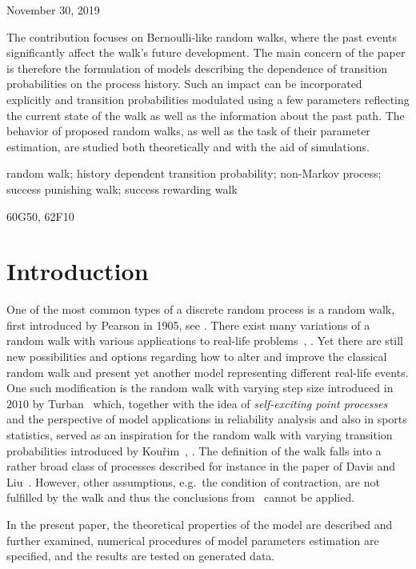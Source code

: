 \rec November 30, 2019

\abstract
The contribution focuses on Bernoulli-like random walks,
 where the past events significantly affect the walk's future
 development.
 The main concern of the paper is therefore the
 formulation of models describing the dependence of transition
 probabilities on the process history.
 Such an impact can be
 incorporated explicitly and transition probabilities modulated
 using a few parameters reflecting the current state of the walk as
 well as the information about the past path.
 The behavior of
 proposed random walks, as well as the task of their parameter
 estimation, are studied both theoretically and with the aid of
 simulations.

\key
random walk; history dependent transition
probability; non-Markov process; success punishing walk; success rewarding walk

\AMS
 60G50, 62F10


\section{Introduction}\label{sec:introduction}

One of the most
common types of a discrete random process is a random walk,
first introduced by Pearson in 1905, see \cite{pearson1905problem}.
There exist many
variations of a random walk with various applications to real-life
problems~\cite{schutz2004elephants}, \cite{turban2010random}.
Yet there are
still new possibilities and options regarding how to alter and improve the classical
random walk and present yet another model representing different
real-life events.
One such modification is the random walk with varying
step size introduced in $2010$ by Turban~\cite{turban2010random}
which, together with the idea of \emph{self-exciting point processes}~\cite{hawkes1971spectra} and the perspective of model applications
in reliability analysis and also in sports statistics, served as an
inspiration for the random walk with varying transition probabilities
introduced by Kou\v{r}im~\cite{ja2017ddny}, \cite{ja2019teze}.
The definition of the walk falls into a rather broad class of processes described for instance in the paper of
Davis and Liu~\cite{davis2012theory}.
However, other assumptions, e.g.~the condition of contraction, are
not fulfilled by the walk and thus the conclusions from~\cite{davis2012theory} cannot be applied.

In the present paper, the theoretical properties of the model are
described and further examined, numerical procedures of model
parameters estimation are specified, and the results are tested on
generated data.

